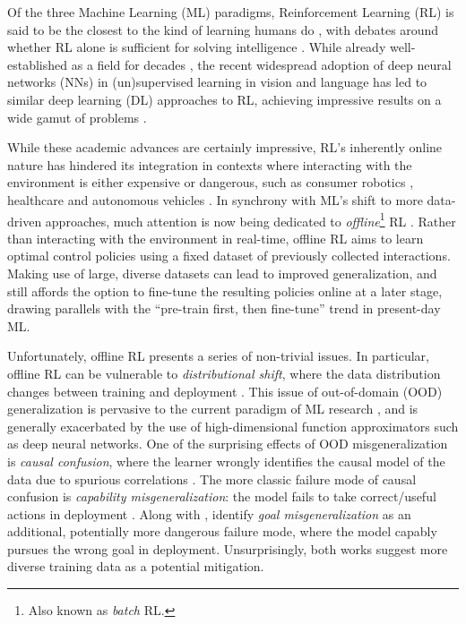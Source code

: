 \documentclass[../thesis-proposal/main.tex]{subfiles}
\begin{document}
Of the three Machine Learning (ML) paradigms, Reinforcement Learning (RL) is said to be the closest
to the kind of learning humans do \citep{sutton_reinforcement_2018}, with debates around whether RL
alone is sufficient for solving intelligence \citep{silver_reward_2021, vamplew_scalar_2022}. While
already well-established as a field for decades \citep{minsky_theory_1954, bellman_dynamic_1957,
klopf_brain_1972, bryson_optimal_1996}, the recent widespread adoption of deep neural networks (NNs)
in (un)supervised learning in vision \citep{krizhevsky_imagenet_2012, he_deep_2016,
mildenhall_nerf_2021} and language \citep{mikolov_distributed_2013, vaswani_attention_2017,
devlin_bert_2019, brown_language_2020} has led to similar deep learning (DL) approaches to RL,
achieving impressive results on a wide gamut of problems \citep{mnih_playing_2013,
silver_general_2018, openai_dota_2019, fawzi_discovering_2022}. 

While these academic advances are certainly impressive, RL's inherently online nature has hindered
its integration in contexts where interacting with the environment is either expensive or dangerous,
such as consumer robotics \citep{singh_reinforcement_2022}, healthcare
\citep{liu_reinforcement_2020} and autonomous vehicles \citep{kiran_deep_2022}. In synchrony with
ML's shift to more data-driven approaches, much attention is now being dedicated to
\textit{offline}\footnote{Also known as \textit{batch} RL.} RL \citep{levine_offline_2020,
prudencio_survey_2022}. Rather than interacting with the environment in real-time, offline RL aims
to learn optimal control policies using a fixed dataset of previously collected interactions. Making
use of large, diverse datasets can lead to improved generalization, and still affords the option to
fine-tune the resulting policies online at a later stage, drawing parallels with the ``pre-train
first, then fine-tune'' trend in present-day ML.

Unfortunately, offline RL presents a series of non-trivial issues. In particular, offline RL can be
vulnerable to \textit{distributional shift}, where the data distribution changes between training
and deployment \citep{quinonero-candela_dataset_2008}. This issue of out-of-domain (OOD)
generalization \citep{shen_towards_2021} is pervasive to the current paradigm of ML research
\citep{arjovsky_out_2020}, and is generally exacerbated by the use of high-dimensional function
approximators such as deep neural networks. One of the surprising effects of OOD misgeneralization
is \textit{causal confusion}, where the learner wrongly identifies the causal model of the data due
to spurious correlations \citep{de_haan_causal_2019}. The more classic  failure mode of causal
confusion is \textit{capability misgeneralization}: the model fails to take correct/useful actions
in deployment \citep{gupta_can_2022, tien_study_2022}. Along with \citet{shah_goal_2022},
\citet{langosco_goal_2022} identify \textit{goal misgeneralization} as an additional, potentially
more dangerous failure mode, where the model capably pursues the wrong goal in deployment.
Unsurprisingly, both works suggest more diverse training data as a potential mitigation.
\end{document}
